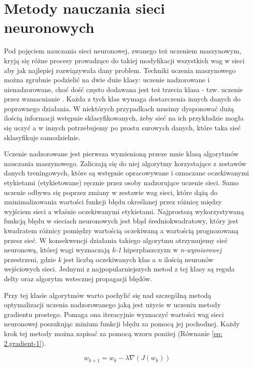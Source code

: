 \documentclass[12pt, oneside, a4paper]{report}
\begin{document}
\section{Metody nauczania sieci neuronowych}

Pod pojęciem nauczania sieci neuronowej, zwanego też uczeniem maszynowym, kryją się różne procesy prowadzące do takiej modyfikacji wszystkich wag w sieci aby jak najlepiej rozwiązywała dany problem. Techniki uczenia maszynowego można zgrubnie podzielić na dwie duże klasy: uczenie nadzorowane i nienadzorowane, choć dość często dodawana jest też trzecia klasa - tzw. uczenie przez wzmacnianie \citep{roelants2017deeplearning}. Każda z tych klas wymaga dostarczenia innych danych do poprawnego działania. W niektórych przypadkach musimy dysponować dużą ilością informacji wstępnie sklasyfikowanych, żeby sieć na ich przykładzie mogła się uczyć a w innych potrzebujemy po prostu surowych danych, które taka sieć sklasyfikuje samodzielnie.

Uczenie nadzorowane jest pierwsza wymienioną przeze mnie klasą algorytmów nauczania maszynowego. Zaliczają się do niej algorytmy korzystające z zestawów danych treningowych, które są wstępnie opracowywane i oznaczane oczekiwanymi etykietami (etykietowane) ręcznie przez osoby nadzorujące uczenie sieci. Samo uczenie odbywa się poprzez zmiany w zestawie wag sieci, które dążą do zminimalizowania wartości funkcji błędu określanej przez różnicę między wyjściem sieci a właśnie oczekiwanymi etykietami. Najprostszą wykorzystywaną funkcją blędu w sieciach neuronowych jest błąd średniokwadratowy, który jest kwadratem różnicy pomiędzy wartością oczekiwaną a wartością prognozowaną przesz sieć. W konsekwencji działania takiego algorytmu otrzymujemy sieć neuronową, której wagi wyznaczają \textit{k-1} hiperpłaszczyzn w \textit{n-wymiarowej} przestrzeni, gdzie \textit{k} jest liczbą oczekiwanych klas a \textit{n} ilością neuronów wejściowych sieci. Jednymi z najpopularniejszych metod z tej klasy są reguła delty oraz algorytm wstecznej propagacji błędów.

Przy tej klasie algorytmów warto pochylić się nad szczególną metodą optymalizacji uczenia nadzorowanego jaką jest użycie w uczeniu metody gradientu prostego. Pomaga ona iteracyjnie wyznaczyć wartości wag sieci neuronowej poszukując minium funkcji błędu za pomocą jej pochodnej. Każdy krok tej metody można zapisać za pomocą wzoru poniżej (Równanie \ref{eq: 2.gradient-1}).

\begin{equation}\label{eq: 2.gradient-1}
	w_{k+1} = w_k - \lambda \nabla (J(w_k))
\end{equation}
\end{document}
